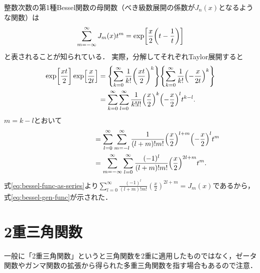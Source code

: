 \documentclass[dvipdfmx,autodetect-engine,12pt,fleqn]{jsarticle}
\begin{document}
整数次数の第1種Bessel関数の母関数（べき級数展開の係数が$J_n(x)$となるような関数）は
\begin{equation}
\label{eq:bessel-gen-func}
    \sum_{m=-\infty}^\infty J_m(x)t^m = \exp\sbra*{\frac{x}{2}\qty(t-\frac{1}{t})}
\end{equation}
と表されることが知られている．
実際，分解してそれぞれTaylor展開すると
\begin{equation}
\begin{split}
    \exp\sbra*{\frac{x t}{2}}\exp\sbra*{\frac{x}{2t}}
    &=\qty{\sum_{k=0}^\infty \frac{1}{k!}\qty(\frac{x t}{2})^k} \qty{\sum_{k=0}^\infty \frac{1}{k!}\qty(-\frac{x}{2t})^k}\\
    &=\sum_{k=0}^\infty \sum_{l=0}^\infty \frac{1}{k! l!}\qty(\frac{x}{2})^k \qty(-\frac{x}{2})^l t^{k-l}.
\end{split} 
\end{equation}
$m=k-l$とおいて
\begin{equation}
\begin{split}
    \phantom{\exp\sbra*{\frac{x t}{2}}\exp\sbra*{\frac{x}{2t}}}
    &=\sum_{l=0}^\infty \sum_{m=-l}^\infty \frac{1}{(l+m)! m!}\qty(\frac{x}{2})^{l+m} \qty(-\frac{x}{2})^l t^m\\
    &=\sum_{m=-\infty}^\infty \sum_{l=0}^\infty \frac{(-1)^l}{(l+m)! m!}\qty(\frac{x}{2})^{2l+m} t^m.
\end{split} 
\end{equation}
式\eqref{eq:bessel-func-as-series}より$\sum_{l=0}^\infty \frac{(-1)^l}{(l+m)! m!}(\frac{x}{2})^{2l+m} = J_m(x)$であるから，式\eqref{eq:bessel-gen-func}が示された．

\section{2重三角関数}
\textreferencemark 一般に「2重三角関数」というと三角関数を2重に適用したものではなく，ゼータ関数やガンマ関数の拡張から得られた多重三角関数を指す場合もあるので注意．
\end{document}
